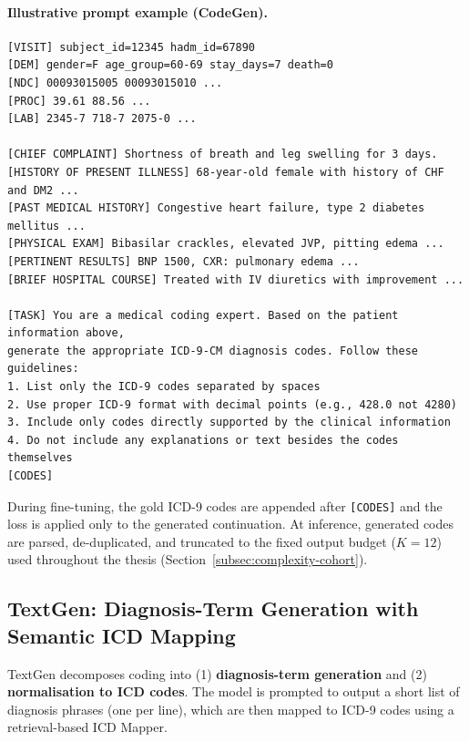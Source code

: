 \paragraph{Illustrative prompt example (CodeGen).}
\begin{tcolorbox}[title={Example Codegen prompt for a single admission},colback=gray!3,colframe=black!30,breakable]
\small
\begin{verbatim}
[VISIT] subject_id=12345 hadm_id=67890
[DEM] gender=F age_group=60-69 stay_days=7 death=0
[NDC] 00093015005 00093015010 ...
[PROC] 39.61 88.56 ...
[LAB] 2345-7 718-7 2075-0 ...

[CHIEF COMPLAINT] Shortness of breath and leg swelling for 3 days.
[HISTORY OF PRESENT ILLNESS] 68-year-old female with history of CHF and DM2 ...
[PAST MEDICAL HISTORY] Congestive heart failure, type 2 diabetes mellitus ...
[PHYSICAL EXAM] Bibasilar crackles, elevated JVP, pitting edema ...
[PERTINENT RESULTS] BNP 1500, CXR: pulmonary edema ...
[BRIEF HOSPITAL COURSE] Treated with IV diuretics with improvement ...

[TASK] You are a medical coding expert. Based on the patient information above,
generate the appropriate ICD-9-CM diagnosis codes. Follow these guidelines:
1. List only the ICD-9 codes separated by spaces
2. Use proper ICD-9 format with decimal points (e.g., 428.0 not 4280)
3. Include only codes directly supported by the clinical information
4. Do not include any explanations or text besides the codes themselves
[CODES]
\end{verbatim}
\end{tcolorbox}

During fine-tuning, the gold ICD-9 codes are appended after \texttt{[CODES]} and the loss is applied only to the generated continuation. At inference, generated codes are parsed, de-duplicated, and truncated to the fixed output budget ($K=12$) used throughout the thesis (Section~\ref{subsec:complexity-cohort}).

\subsection{TextGen: Diagnosis-Term Generation with Semantic ICD Mapping}
\label{subsec:textgen-arch}

TextGen decomposes coding into (1) \textbf{diagnosis-term generation} and (2) \textbf{normalisation to ICD codes}. The model is prompted to output a short list of diagnosis phrases (one per line), which are then mapped to ICD-9 codes using a retrieval-based ICD Mapper.

